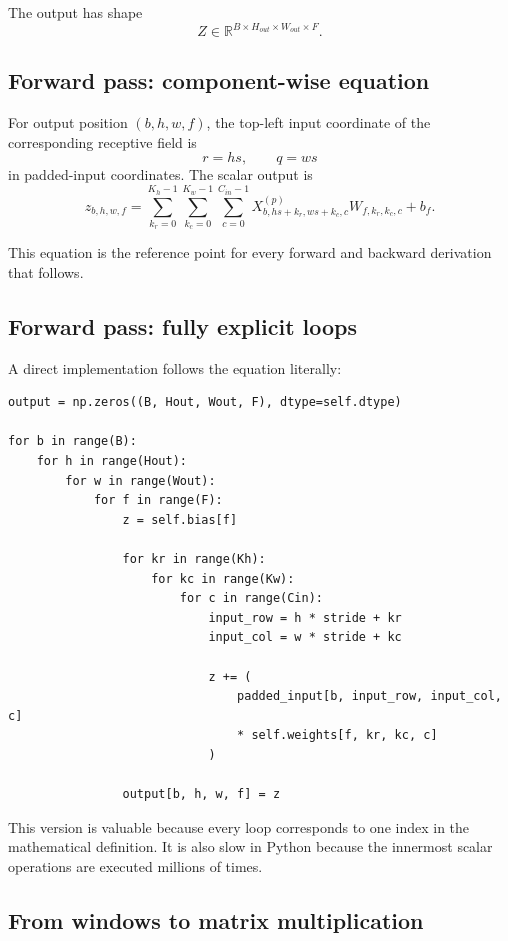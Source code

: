 \documentclass[11pt,a4paper]{article}
\newcommand{\R}{\mathbb{R}}
\begin{document}
The output has shape
\[
Z\in\R^{B\times H_{out}\times W_{out}\times F}.
\]

\subsection{Forward pass: component-wise equation}

For output position $(b,h,w,f)$, the top-left input coordinate of the corresponding receptive field is
\[
r=h s,\qquad q=w s
\]
in padded-input coordinates. The scalar output is
\[
\boxed{
z_{b,h,w,f}
=
\sum_{k_r=0}^{K_h-1}
\sum_{k_c=0}^{K_w-1}
\sum_{c=0}^{C_{in}-1}
X^{(p)}_{b,hs+k_r,ws+k_c,c}
W_{f,k_r,k_c,c}
+b_f
}.
\]

This equation is the reference point for every forward and backward derivation that follows.

\subsection{Forward pass: fully explicit loops}

A direct implementation follows the equation literally:
\begin{lstlisting}
output = np.zeros((B, Hout, Wout, F), dtype=self.dtype)

for b in range(B):
    for h in range(Hout):
        for w in range(Wout):
            for f in range(F):
                z = self.bias[f]

                for kr in range(Kh):
                    for kc in range(Kw):
                        for c in range(Cin):
                            input_row = h * stride + kr
                            input_col = w * stride + kc

                            z += (
                                padded_input[b, input_row, input_col, c]
                                * self.weights[f, kr, kc, c]
                            )

                output[b, h, w, f] = z
\end{lstlisting}

This version is valuable because every loop corresponds to one index in the mathematical definition. It is also slow in Python because the innermost scalar operations are executed millions of times.

\subsection{From windows to matrix multiplication}
\end{document}
